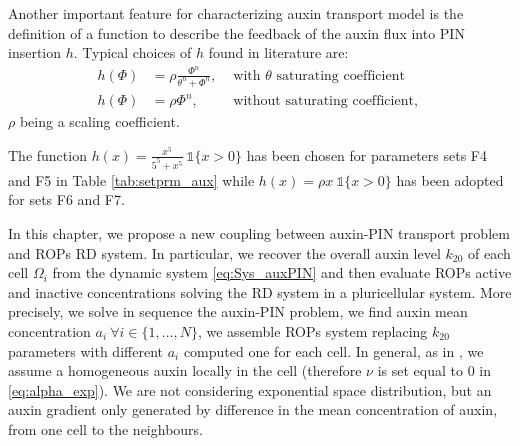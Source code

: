 Another important feature for characterizing auxin transport model is the definition of a function to describe the feedback of the auxin flux into PIN insertion $h$. Typical choices of $h$ found in literature are:
\begin{equation}\begin{aligned}
    h\left(\Phi \right) & = \rho \frac{\Phi^n}{\theta^n + \Phi^n}, &\text{ with } \theta \text{ saturating coefficient} \\
    h\left(\Phi \right) & = \rho \Phi^n, &\text{ without saturating coefficient, }
\end{aligned} \end{equation}
$\rho$ being a scaling coefficient.

The function $h(x) = \frac{x^5}{5^5 + x^5} \ \mathbb{1}\{x>0 \}$ has been chosen for parameters sets F4 and F5 in Table \ref{tab:setprm_aux} while  $h(x) = \rho x \ \mathbb{1}\{x>0 \}$ has been adopted for sets F6 and F7.

In this chapter, we propose a new coupling between auxin-PIN transport problem and ROPs RD system. In particular, we recover the overall auxin level $k_{20}$ of each cell $\Omega_i$ from the dynamic system \eqref{eq:Sys_auxPIN} and then evaluate ROPs active and inactive concentrations solving the RD system in a pluricellular system. More precisely, we solve in sequence the auxin-PIN problem, we find auxin mean concentration $a_i \ \forall i \in \{1, ..., N\}$, we assemble ROPs system replacing $k_{20}$ parameters with different $a_i$ computed one for each cell. In general, as in \cite{plant:Farcot}, we assume a homogeneous auxin locally in the cell (therefore $\nu$ is set equal to 0 in \eqref{eq:alpha_exp}). We are not considering exponential space distribution, but an auxin gradient only generated by difference in the mean concentration of auxin, from one cell to the neighbours.


